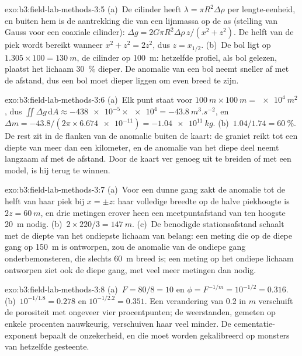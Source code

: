 \begin{solution}{exo:b3:field-lab-methods-3:5}
(a)~De cilinder heeft $\lambda = \pi R^2\Delta\rho$ per lengte-eenheid, en
buiten hem is de aantrekking die van een lijnmassa op de as (stelling van Gauss
voor een coaxiale cilinder): $\Delta g = 2G\pi R^2\Delta\rho\,z/(x^2
+ z^2)$. De helft van de piek wordt bereikt wanneer $x^2 + z^2 = 2z^2$, dus $z =
x_{1/2}$. (b)~De bol ligt op $1.305\times100 = \qty{130}{m}$, de
cilinder op \qty{100}{m}: hetzelfde profiel, als bol gelezen, plaatst het lichaam
\qty{30}{\percent} dieper. De anomalie van een bol neemt sneller af met
de afstand, dus een bol moet dieper liggen om even breed te zijn.
\end{solution}

\begin{solution}{exo:b3:field-lab-methods-3:6}
(a)~Elk punt staat voor $\qty{100}{m}\times\qty{100}{m} =
\qty{e4}{m^2}$, dus $\iint\Delta g\,\mathrm{d}A \approx
\num{-438e-5}\times\num{e4} = \qty{-43.8}{m^3.s^{-2}}$, en $\Delta m
= -43.8/(2\pi\times\num{6.674e-11}) = \qty{-1.04e11}{kg}$. (b)~$1.04/1.74
= \qty{60}{\percent}$. De rest zit in de flanken van de anomalie buiten
de kaart: de graniet reikt tot een diepte van meer dan een kilometer, en de
anomalie van het diepe deel neemt langzaam af met de afstand. Door de kaart
ver genoeg uit te breiden of met een model, is hij terug te winnen.
\end{solution}

\begin{solution}{exo:b3:field-lab-methods-3:7}
(a)~Voor een dunne gang zakt de anomalie tot de helft van haar piek bij $x = \pm z$:
haar volledige breedte op de halve piekhoogte is $2z = \qty{60}{m}$, en drie
metingen erover heen een meetpuntafstand van ten hoogste \qty{20}{m} nodig. (b)~$2\times
220/3 = \qty{147}{m}$. (c)~De benodigde stationsafstand schaalt met de
diepte van het ondiepste lichaam van belang: een meting die op de diepe
gang op \qty{150}{m} is ontworpen, zou de anomalie van de ondiepe gang onderbemonsteren, die
slechts \qty{60}{m} breed is; een meting op het ondiepe lichaam ontworpen ziet ook de
diepe gang, met veel meer metingen dan nodig.
\end{solution}

\begin{solution}{exo:b3:field-lab-methods-3:8}
(a)~$F = 80/8 = 10$ en $\phi = F^{-1/m} = 10^{-1/2} = \num{0.316}$.
(b)~$10^{-1/1.8} = \num{0.278}$ en $10^{-1/2.2} = \num{0.351}$. Een verandering
van \num{0.2} in $m$ verschuift de porositeit met ongeveer vier procentpunten;
de weerstanden, gemeten op enkele procenten nauwkeurig, verschuiven haar veel minder. De
cementatie-exponent bepaalt de onzekerheid, en die moet worden gekalibreerd
op monsters van hetzelfde gesteente.
\end{solution}

